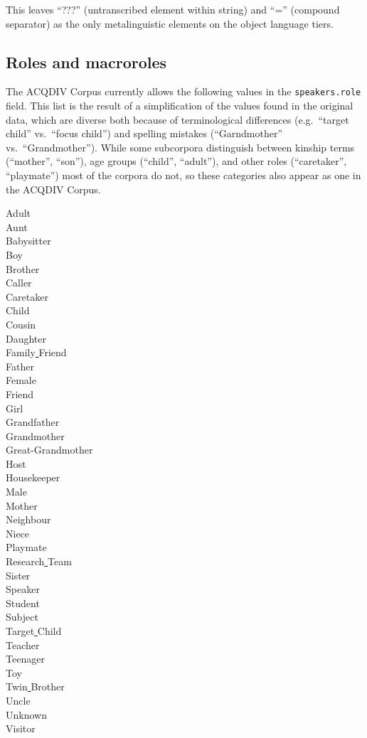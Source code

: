 \documentclass[a4paper, 11pt]{book}
\newcommand{\und}{\underline{{ }}\hspace{0.2mm}}	%
\begin{document}
This leaves “???” (untranscribed element within string) and “=” (compound separator) as the only metalinguistic elements on the object language tiers. 

\subsection{Roles and macroroles}
\label{subsec:Roles and macroroles}

The ACQDIV Corpus currently allows the following values in the \texttt{speakers.role} field. This list is the result of a simplification of the values found in the original data, which are diverse both because of terminological differences (e.g.\ “target child” vs.\ “focus child”) and spelling mistakes (“Garndmother” vs.\ “Grandmother”). While some subcorpora distinguish between kinship terms (“mother”, “son”), age groups (“child”, “adult”), and other roles (“caretaker”, “playmate”) most of the corpora do not, so these categories also appear as one in the ACQDIV Corpus. 

\begin{multicols}{4}
	\noindent Adult \\
	Aunt \\
	Babysitter \\
	Boy \\
	Brother \\
	Caller \\
	Caretaker \\
	Child \\
	Cousin \\
	Daughter \\
	Family\und Friend \\
	Father \\
	Female \\
	Friend \\
	Girl \\
	Grandfather \\
	Grandmother \\
	Great-Grandmother \\
	Host \\
	Housekeeper \\
	Male \\
	Mother \\
	Neighbour \\
	Niece \\
	Playmate \\
	Research\und Team \\
	Sister \\
	Speaker \\
	Student \\
	Subject \\
	Target\und Child \\
	Teacher \\
	Teenager \\
	Toy \\
	Twin\und Brother \\
	Uncle \\
	Unknown \\
	Visitor \\
\end{multicols}
\end{document}
